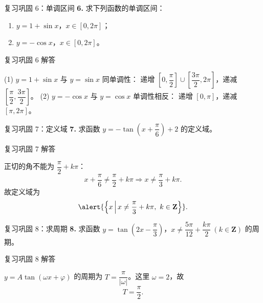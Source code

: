 \documentclass[10pt,aspectratio=169,serif]{beamer}
\begin{document}
\begin{frame}[t]{复习巩固 6：单调区间}
\textbf{6.} 求下列函数的单调区间：
\begin{enumerate}[(1)]
  \item $y=1+\sin x$，$x\in[0,2\pi]$； \qquad
  \item $y=-\cos x$，$x\in[0,2\pi]$。
\end{enumerate}
\end{frame}

\begin{frame}[t]{复习巩固 6 解答}
\begin{tcolorbox}[colback=orange!10,colframe=orange,title=\textbf{解}]
(1) $y=1+\sin x$ 与 $y=\sin x$ 同单调性：
\alert{递增} $\left[0,\dfrac{\pi}{2}\right]\cup\left[\dfrac{3\pi}{2},2\pi\right]$，\alert{递减} $\left[\dfrac{\pi}{2},\dfrac{3\pi}{2}\right]$。
\vspace{0.3em}
(2) $y=-\cos x$ 与 $y=\cos x$ 单调性相反：
\alert{递增} $[0,\pi]$，\alert{递减} $[\pi,2\pi]$。
\end{tcolorbox}
\end{frame}

\begin{frame}[t]{复习巩固 7：定义域}
\textbf{7.} 求函数 $y=-\tan\!\left(x+\dfrac{\pi}{6}\right)+2$ 的定义域。
\end{frame}

\begin{frame}[t]{复习巩固 7 解答}
\begin{tcolorbox}[colback=orange!10,colframe=orange,title=\textbf{解}]
正切的角不能为 $\dfrac{\pi}{2}+k\pi$：
\[
x+\frac{\pi}{6}\ne\frac{\pi}{2}+k\pi \Rightarrow x\ne\frac{\pi}{3}+k\pi.
\]
故定义域为
\[
\alert{\left\{x\,\middle|\,x\ne\frac{\pi}{3}+k\pi,\ k\in\mathbf Z\right\}}.
\]
\end{tcolorbox}
\end{frame}

\begin{frame}[t]{复习巩固 8：求周期}
\textbf{8.} 求函数 $y=\tan\!\left(2x-\dfrac{\pi}{3}\right)$，$x\ne\dfrac{5\pi}{12}+\dfrac{k\pi}{2}\ (k\in\mathbf Z)$ 的周期。
\end{frame}

\begin{frame}[t]{复习巩固 8 解答}
\begin{tcolorbox}[colback=orange!10,colframe=orange,title=\textbf{解}]
$y=A\tan(\omega x+\varphi)$ 的周期为 $T=\dfrac{\pi}{|\omega|}$。这里 $\omega=2$，故
\[
T=\frac{\pi}{2}.
\]
\end{tcolorbox}
\end{frame}
\end{document}
